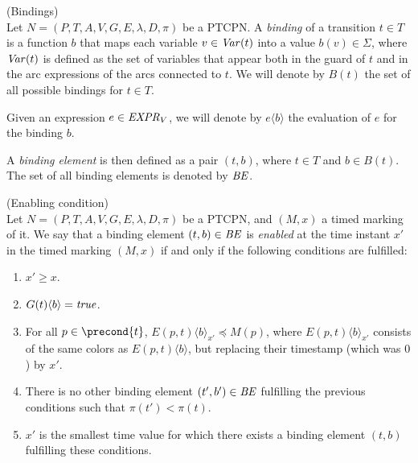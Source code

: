 \bdfn (Bindings)\\
Let $N=(P,T,A,V,G,E,\lambda,D,\pi)$ be a PTCPN.
A {\em binding} of a transition $t \in T$ is a function
$b$ that maps each variable $v \in {\it Var}(t)$
into a value $b(v) \in \Sigma$, where ${\it Var}(t)$
is defined as the set of variables that appear both
in the guard of $t$ and
in the arc expressions of the arcs connected to $t$.
We will denote by $B(t)$ the set of all possible bindings
for $t \in T$. 

Given an expression $e \in {\it EXPR}_V$, we will denote 
by $e\langle b \rangle$ the evaluation of $e$ for the
binding $b$.

A {\em binding element} is then defined as a pair
$(t,b)$, where $t \in T$ and $b \in B(t)$.
The set of all binding elements is denoted by ${\it BE}$.
\edfn

\bdfn\label{permitidas} (Enabling condition)\\
Let $N=(P,T,A,V,G,E,\lambda,D,\pi)$ be a PTCPN,
and $(M,x)$ a timed marking of it.
We say that a 
binding element $(t,b) \in {\it BE}$
is {\em enabled} at the time instant $x'$ in the timed marking
$(M,x)$ if and
only if the following conditions are fulfilled:

\begin{enumerate}
\item $x' \geq x$.
%
\item $G(t)\langle b \rangle = {\it true}$.
%
\item For all $p \in \precond{t}$,
$E(p,t)\langle b\rangle_{x'} \preceq M(p)$, 
where 
%
$E(p,t)\langle b \rangle_{x'}$ consists of the same
colors as $E(p,t)\langle b \rangle$, but 
replacing their timestamp (which was $0$) by $x'$.
%
%
\item There is no other binding element $(t',b') \in {\it BE}$
fulfilling the previous conditions  such that $\pi(t') < \pi(t)$.
%
%
\item $x'$ is the smallest time value for which there exists
a binding element $(t,b)$ fulfilling these conditions.
%
\end{enumerate}
%
\edfn

